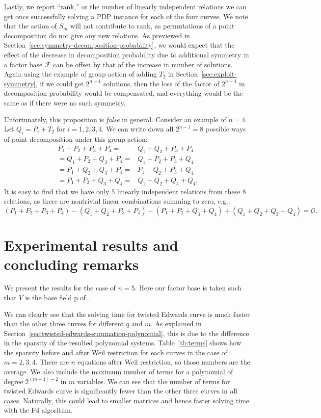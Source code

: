 Lastly, we report ``rank,'' or the number of linearly independent
relations we can get once successfully solving a PDP instance for each
of the four curves.
%
We note that the action of $S_m$ will not contribute to rank, as
permutations of a point decomposition do not give any new relations.
%
As previewed in Section~\ref{sec:symmetry-decomposition-probability},
we would expect that the effect of the decrease in decomposition
probability due to additional symmetry in a factor base $\mathcal F$
can be offset by that of the increase in number of solutions.
%
Again using the example of group action of adding $T_2$ in
Section~\ref{sec:exploit-symmetry}, if we could get $2^{n-1}$
solutions, then the loss of the factor of $2^{n-1}$ in decomposition
probability would be compensated, and everything would be the same as
if there were no such symmetry.

Unfortunately, this proposition is \emph{false} in general.
%
Consider an example of $n=4$.
%
Let $Q_i=P_i+ T_2$ for $i=1,2,3,4$.
%
We can write down all $2^{n-1}=8$ possible ways of point decomposition
under this group action:
%
\[ \begin{aligned}
P_1 + P_2 + P_3 + P_4 = & Q_1 + Q_2 + P_3 + P_4 \\
= Q_1 + P_2 + Q_3 + P_4 = & Q_1 + P_2 + P_3 + Q_4 \\
= P_1 + Q_2 + Q_3 + P_4 = & P_1 + Q_2 + P_3 + Q_4 \\
= P_1 + P_2 + Q_3 + Q_4 = & Q_1 + Q_2 + Q_3 + Q_4.
\end{aligned} \]
%
It is easy to find that we have only 5 linearly independent relations
from these 8 relations, as there are nontrivial linear combinations
summing to zero, e.g.:
\[ (P_1 + P_2 + P_3 + P_4) - (Q_1 + Q_2 + P_3 + P_4) - (P_1 + P_2 +
  Q_3 + Q_4) + (Q_1 + Q_2 + Q_3 + Q_4) = \mathcal O.\]

\section{Experimental results and concluding remarks}
\label{sec:experiment-result}

We present the results for the case of $n=5$.
%
Here our factor base is taken such that $V$ is the base field \F p of
.
%


We can clearly see that the solving time for twisted Edwards curve is
much faster than the other three curves for different $q$ and $m$.
%
As explained in
Section~\ref{sec:twisted-edwards-summation-polynomial}, this is due to
the difference in the sparsity of the resulted polynomial systems.
%
Table~\ref{tb:terms} shows how the sparsity before and after Weil
restriction for each curves in the case of $m=2,3,4$.
%
There are $n$ equations after Weil restriction, so those numbers are
the average.
%
We also include the maximum number of terms for a polynomial of degree
$2^{(m+1)-2}$ in $m$ variables.
%
We can see that the number of terms for twisted Edwards curve is
significantly fewer than the other three curves in all cases.
%
Naturally, this could lead to smaller matrices and hence faster
solving time with the F4 algorithm.

